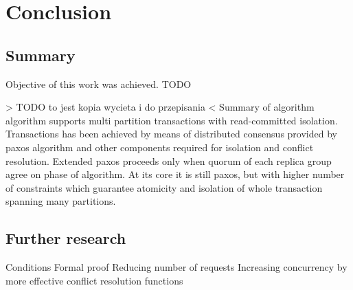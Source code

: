 
\chapter{Conclusion}\label{chapter:summary}

\section{Summary}
Objective of this work was achieved. TODO


> TODO to jest kopia wycieta i do przepisania <
Summary of algorithm
\mpt algorithm supports multi partition transactions with read-committed isolation. Transactions has been achieved by means of distributed consensus provided by paxos algorithm and other components required for isolation and conflict resolution. Extended paxos proceeds only when quorum of each replica group agree on phase of algorithm. At its core it is still paxos, but with higher number of constraints which guarantee atomicity and isolation of whole transaction spanning many partitions.

\section{Further research}
Conditions
Formal proof
Reducing number of requests
Increasing concurrency by more effective conflict resolution functions


